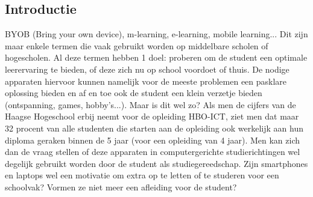 \documentclass[a0,portrait]{a0poster}
\begin{document}
\begin{multicols}{2}
\section*{Introductie}
\color{black}
\color{black}
BYOB (Bring your own device), m-learning, e-learning, mobile learning... Dit zijn maar enkele termen die vaak gebruikt worden op middelbare scholen of hogescholen. Al deze termen hebben 1 doel: proberen om de student een optimale leerervaring te bieden, of deze zich nu op school voordoet of thuis. De nodige apparaten hiervoor kunnen namelijk voor de meeste problemen een pasklare oplossing bieden en af en toe ook de student een klein verzetje bieden (ontspanning, games, hobby’s...). Maar is dit wel zo? Als men de cijfers van de Haagse Hogeschool erbij neemt voor de opleiding HBO-ICT, ziet men dat maar 32 procent van alle studenten die starten aan de opleiding ook werkelijk aan hun diploma geraken binnen de 5 jaar (voor een opleiding van 4 jaar). Men kan zich dan de vraag stellen of deze apparaten in computergerichte studierichtingen wel degelijk gebruikt worden door de student als studiegereedschap. Zijn smartphones en laptops wel een motivatie om extra op te letten
of te studeren voor een schoolvak? Vormen ze niet meer een afleiding voor de student?

\color{Black} %
\color{HoGentAccent1} 

\end{multicols}
\end{document}
